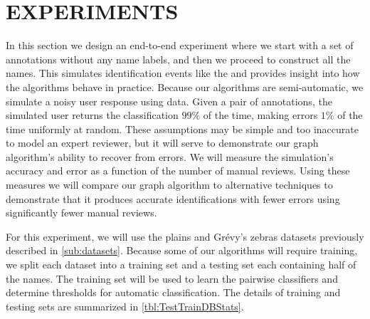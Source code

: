 \poisson{}




\section{EXPERIMENTS}\label{sec:graphexpt}

    In this section we design an end-to-end experiment where we start with a set of annotations without any name
      labels, and then we proceed to construct all the names.
    This simulates identification events like the \GZC{} and provides insight into how the algorithms behave in
      practice.
    Because our algorithms are semi-automatic, we simulate a noisy user response using \groundtruth{} data.
    Given a pair of annotations, the simulated user returns the \groundtruth{} classification $99\percent$ of the
      time, making errors $1\percent$ of the time uniformly at random.
    These assumptions may be simple and too inaccurate to model an expert reviewer, but it will serve to
      demonstrate our graph algorithm's ability to recover from errors.
    We will measure the simulation's accuracy and error as a function of the number of manual reviews.
    Using these measures we will compare our graph algorithm to alternative techniques to demonstrate that it
      produces accurate identifications with fewer errors using significantly fewer manual reviews.

    For this experiment, we will use the plains and Grévy's zebras datasets previously described in
      \cref{sub:datasets}.
    Because some of our algorithms will require training, we split each dataset into a training set and a testing
      set each containing half of the names.
    The training set will be used to learn the pairwise classifiers and determine thresholds for automatic
      classification.
    The details of training and testing sets are summarized in \cref{tbl:TestTrainDBStats}.
    \TestTrainDBStats{}
    \FloatBarrier{}

